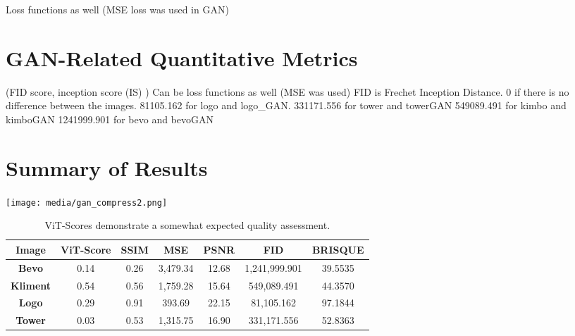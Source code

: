 Loss functions as well (MSE loss was used in GAN)


\section{GAN-Related Quantitative Metrics}


(FID score, inception score (IS) )
Can be loss functions as well (MSE was used)
FID is Frechet Inception Distance. 0 if there is no difference between the images.
81105.162 for logo and logo\_GAN.
331171.556 for tower and towerGAN
549089.491 for kimbo and kimboGAN
1241999.901 for bevo and bevoGAN


\section{Summary of Results}

\begin{center}
	\texttt{[image: media/gan\_compress2.png]}
\end{center}

\begin{table}[H]
    \begin{center}
    \begin{tabular}{|c|c|c|c|c|c|c|}
    \hline
    \textbf{Image}	& \textbf{ViT-Score} & \textbf{SSIM} & \textbf{MSE} & \textbf{PSNR} & \textbf{FID} & \textbf{BRISQUE} \\
    \hline
    \textbf{Bevo}	 & 0.14 & 0.26 & 3,479.34  &  12.68  &  1,241,999.901  &  39.5535\\
    \textbf{Kliment} & 0.54 & 0.56 & 1,759.28 & 15.64  &  549,089.491 & 44.3570\\
    \textbf{Logo}	 & 0.29 & 0.91 & 393.69 & 22.15 &  81,105.162 & 97.1844\\
    \textbf{Tower}   & 0.03 & 0.53 & 1,315.75 & 16.90 &  331,171.556 & 52.8363\\\hline
    
    \end{tabular}
    \caption[Summary of Results]{ViT-Scores demonstrate a somewhat expected quality assessment.}
    \end{center}
    \end{table}